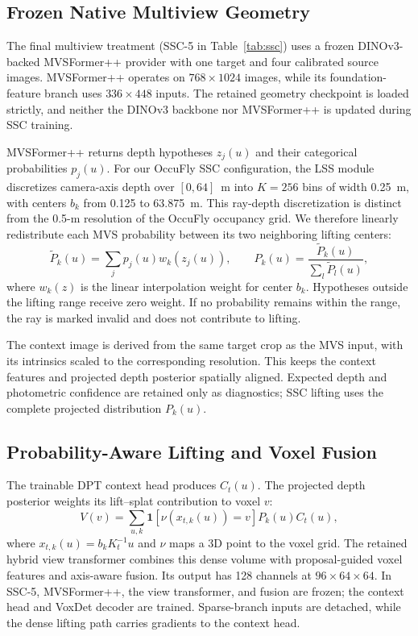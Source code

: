 \subsection{Frozen Native Multiview Geometry}
The final multiview treatment (SSC-5 in Table~\ref{tab:ssc}) uses a frozen DINOv3-backed MVSFormer++ provider with one target and four calibrated source images. MVSFormer++ operates on $768\times1024$ images, while its foundation-feature branch uses $336\times448$ inputs. The retained geometry checkpoint is loaded strictly, and neither the DINOv3 backbone nor MVSFormer++ is updated during SSC training.

MVSFormer++ returns depth hypotheses $z_j(u)$ and their categorical probabilities $p_j(u)$. For our OccuFly SSC configuration, the LSS module discretizes camera-axis depth over $[0,64]$~m into $K=256$ bins of width 0.25~m, with centers $b_k$ from 0.125 to 63.875~m. This ray-depth discretization is distinct from the 0.5-m resolution of the OccuFly occupancy grid. We therefore linearly redistribute each MVS probability between its two neighboring lifting centers:
\begin{equation}
\widetilde P_k(u)=\sum_j p_j(u)w_k\!\left(z_j(u)\right),
\qquad
P_k(u)=\frac{\widetilde P_k(u)}
{\sum_l\widetilde P_l(u)} ,
\label{eq:posterior}
\end{equation}
where $w_k(z)$ is the linear interpolation weight for center $b_k$. Hypotheses outside the lifting range receive zero weight. If no probability remains within the range, the ray is marked invalid and does not contribute to lifting.

The context image is derived from the same target crop as the MVS input, with its intrinsics scaled to the corresponding resolution. This keeps the context features and projected depth posterior spatially aligned. Expected depth and photometric confidence are retained only as diagnostics; SSC lifting uses the complete projected distribution $P_k(u)$.

\subsection{Probability-Aware Lifting and Voxel Fusion}
The trainable DPT context head produces $C_t(u)$. The projected depth posterior weights its lift--splat contribution to voxel $v$:
\begin{equation}
V(v)=\sum_{u,k}\mathbf1[\nu(x_{t,k}(u))=v]P_k(u)C_t(u),
\label{eq:lift}
\end{equation}
where $x_{t,k}(u)=b_kK_t^{-1}u$ and $\nu$ maps a 3D point to the voxel grid. The retained hybrid view transformer combines this dense volume with proposal-guided voxel features and axis-aware fusion. Its output has 128 channels at $96\times64\times64$. In SSC-5, MVSFormer++, the view transformer, and fusion are frozen; the context head and VoxDet decoder are trained. Sparse-branch inputs are detached, while the dense lifting path carries gradients to the context head.

